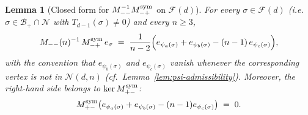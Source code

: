 \documentclass{amsart}
\newtheorem{lemma}[theorem]{Lemma}
\theoremstyle{definition}
\theoremstyle{remark}
\begin{document}
\begin{lemma}[Closed form for $M_{--}^{-1} M_{-+}^{\rm sym}$ on $\mathcal{F}(d)$]
\label{lem:Mmm-inv-on-F}
For every $\sigma \in \mathcal{F}(d)$ \textup{(}i.e.\ $\sigma \in
\mathcal{B}_+ \cap \mathcal{N}$ with $T_{d-1}(\sigma) \neq 0$\textup{)}
and every $n \ge 3$,
\begin{equation}\label{eq:Mmm-inv-on-F}
  M_{--}(n)^{-1}\, M_{-+}^{\rm sym}\, e_\sigma
  \;=\; \frac{1}{n-2}\Bigl(
        e_{\psi_a(\sigma)}
        + e_{\psi_b(\sigma)}
        - (n-1)\,e_{\psi_c(\sigma)}
        \Bigr),
\end{equation}
with the convention that $e_{\psi_b(\sigma)}$ and $e_{\psi_c(\sigma)}$
vanish whenever the corresponding vertex is not in $\mathcal{N}(d, n)$
\textup{(}cf.\ Lemma~\ref{lem:psi-admissibility}\textup{)}.
Moreover, the right-hand side belongs to $\ker M_{+-}^{\rm sym}$:
\begin{equation}\label{eq:Mpm-vanishes}
  M_{+-}^{\rm sym}\bigl(
        e_{\psi_a(\sigma)} + e_{\psi_b(\sigma)} - (n-1) e_{\psi_c(\sigma)}
        \bigr) \;=\; 0.
\end{equation}
\end{lemma}
\end{document}
